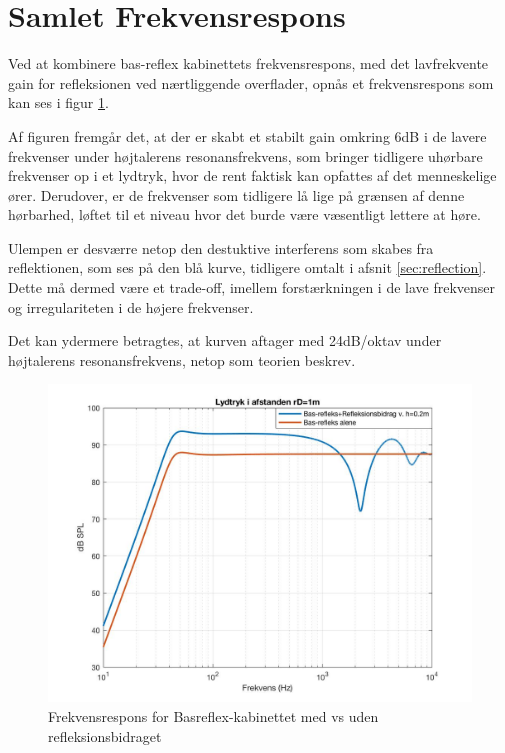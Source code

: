\section{Samlet Frekvensrespons}

Ved at kombinere bas-reflex kabinettets frekvensrespons, med det lavfrekvente gain for refleksionen ved nærtliggende overflader, opnås et frekvensrespons som kan ses i figur \ref{fig:sim_samletrespons}.

Af figuren fremgår det, at der er skabt et stabilt gain omkring 6dB i de lavere frekvenser under højtalerens resonansfrekvens, som bringer tidligere uhørbare frekvenser op i et lydtryk, hvor de rent faktisk kan opfattes af det menneskelige ører. Derudover, er de frekvenser som tidligere lå lige på grænsen af denne hørbarhed, løftet til et niveau hvor det burde være væsentligt lettere at høre.

Ulempen er desværre netop den destuktive interferens som skabes fra reflektionen, som ses på den blå kurve, tidligere omtalt i afsnit \ref{sec:reflection}.\\
Dette må dermed være et trade-off, imellem forstærkningen i de lave frekvenser og irregulariteten i de højere frekvenser. 

Det kan ydermere betragtes, at kurven aftager med 24dB/oktav under højtalerens resonansfrekvens, netop som teorien beskrev.
\begin{figure}[h!]
	\centering
	\includegraphics[width=\textwidth]{Pics/sim_samletrespons}
	\caption{Frekvensrespons for Basreflex-kabinettet med vs uden refleksionsbidraget} 
	\label{fig:sim_samletrespons}
\end{figure}



 

